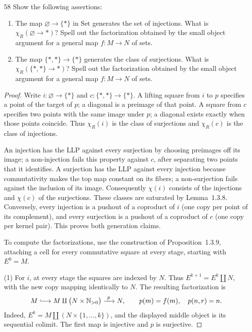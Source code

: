 \begin{exercise}{58}
Show the following assertions:
\begin{enumerate}[label=(\arabic*)]
\item The map $\varnothing\to\{*\}$ in $\mathrm{Set}$ generates the set of injections. What is $\chi_R(\varnothing\to *)$? Spell out
the factorization obtained by the small object argument for a general map $f\colon M\to N$
of sets.
\item The map $\{*,*\}\to\{*\}$ generates the class of surjections. What is $\chi_R(\{*,*\}\to *)$? Spell
out the factorization obtained by the small object argument for a general map $f\colon M\to
N$ of sets.
\end{enumerate}

\begin{proof}
Write $i\colon\varnothing\to\{*\}$ and
$c\colon\{*,*\}\to\{*\}$.
A lifting square from $i$ to $p$ specifies a point of the target
of $p$; a diagonal is a preimage of that point.
A square from $c$ specifies two points with the same image
under $p$; a diagonal exists exactly when those points coincide.
Thus $\chi_R(i)$ is the class of surjections and
$\chi_R(c)$ is the class of injections.

An injection has the LLP against every surjection by choosing
preimages off its image; a non-injection fails this property
against $c$, after separating two points that it identifies.
A surjection has the LLP against every injection because
commutativity makes the top map constant on its fibers;
a non-surjection fails against the inclusion of its image.
Consequently $\chi(i)$ consists of the injections and
$\chi(c)$ of the surjections.
These classes are saturated by Lemma~1.3.8.
Conversely, every injection is a pushout of a coproduct of $i$
(one copy per point of its complement), and every surjection
is a pushout of a coproduct of $c$ (one copy per kernel pair).
This proves both generation claims.

To compute the factorizations, use the construction of
Proposition~1.3.9, attaching a cell for every commutative square
at every stage, starting with $E^0=M$.

(1) For $i$, at every stage the squares are indexed by $N$.
Thus $E^{k+1}=E^k\amalg N$, with the new copy mapping identically
to $N$. The resulting factorization is
\[
 M\lhook\joinrel\longrightarrow
 M\amalg\bigl(N\times\mathbb N_{>0}\bigr)
 \xrightarrow{\ p\ }N,
 \qquad p(m)=f(m),\quad p(n,r)=n.
\]
Indeed, $E^k=M\amalg(N\times\{1,\ldots,k\})$, and the displayed
middle object is its sequential colimit.
The first map is injective and $p$ is surjective.


\end{proof}
\end{exercise}
